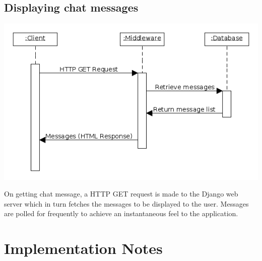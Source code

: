 \documentclass{sig-alt-release2}
\begin{document}
\subsection{Displaying chat messages}
\includegraphics[scale=0.4]{getmessage.png}

On getting chat message, a HTTP GET request is made to the Django web server which in turn fetches the messages to be displayed to the user. Messages are polled for frequently to achieve an instantaneous feel to the application.





\section{Implementation Notes}
\label{sec: implementation}
\end{document}

